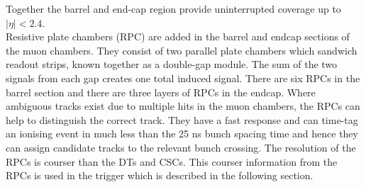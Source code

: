 Together the barrel and end-cap region provide uninterrupted coverage up to $|\eta|<2.4$.\\
Resistive plate chambers (RPC) are added in the barrel and endcap sections of the muon chambers. They consist of two parallel plate chambers which sandwich readout strips, known together as a double-gap module. The sum of the two signals from each gap creates one total induced signal. There are six RPCs in the barrel section and there are three layers of RPCs in the endcap.
Where ambiguous tracks exist due to multiple hits in the muon chambers, the RPCs can help to distinguish the correct track. They have a fast response and can time-tag an ionising event in much less than the 25 ns bunch spacing time and hence they can assign candidate tracks to the relevant bunch crossing. The resolution of the RPCs is courser than the DTs and CSCs. This courser information from the RPCs is used in the trigger which is described in the following section.


